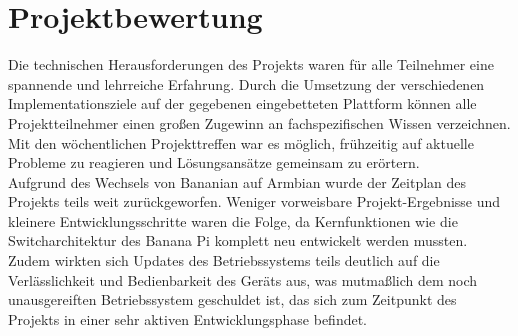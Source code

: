 \chapter{Projektbewertung}
Die technischen Herausforderungen des Projekts waren für alle Teilnehmer eine spannende und lehrreiche Erfahrung. Durch die Umsetzung der verschiedenen Implementationsziele auf der gegebenen eingebetteten Plattform können alle Projektteilnehmer einen großen Zugewinn an fachspezifischen Wissen verzeichnen.\\
Mit den wöchentlichen Projekttreffen war es möglich, frühzeitig auf aktuelle Probleme zu reagieren und Lösungsansätze gemeinsam zu erörtern.\\
Aufgrund des Wechsels von Bananian auf Armbian wurde der Zeitplan des Projekts  teils weit zurückgeworfen. Weniger vorweisbare Projekt-Ergebnisse und kleinere Entwicklungsschritte waren die Folge, da Kernfunktionen wie die Switcharchitektur des Banana Pi komplett neu entwickelt werden mussten. Zudem wirkten sich Updates des Betriebssystems teils deutlich auf die Verlässlichkeit und Bedienbarkeit des Geräts aus, was mutmaßlich dem noch unausgereiften Betriebssystem geschuldet ist, das sich zum Zeitpunkt des Projekts in einer sehr aktiven Entwicklungsphase befindet.\\
